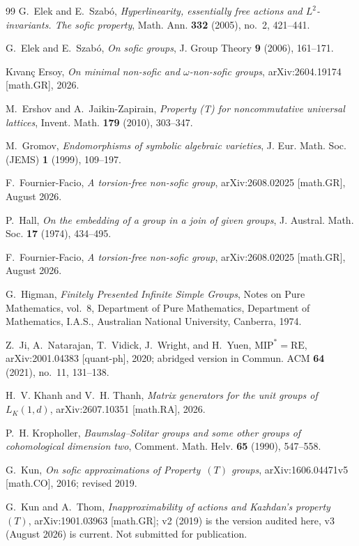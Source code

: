 \documentclass[11pt]{amsart}
\theoremstyle{definition}
\theoremstyle{plain}
\begin{document}
\begin{thebibliography}{99}
G.~Elek and E.~Szab\'o,
\emph{Hyperlinearity, essentially free actions and $L^2$-invariants.  The sofic property},
Math. Ann. \textbf{332} (2005), no.~2, 421--441.

G.~Elek and E.~Szab\'o,
\emph{On sofic groups},
J. Group Theory \textbf{9} (2006), 161--171.

K{\i}van\c{c} Ersoy,
\emph{On minimal non-sofic and $\omega$-non-sofic groups},
arXiv:2604.19174 [math.GR], 2026.

M.~Ershov and A.~Jaikin-Zapirain,
\emph{Property (T) for noncommutative universal lattices},
Invent. Math. \textbf{179} (2010), 303--347.

M.~Gromov,
\emph{Endomorphisms of symbolic algebraic varieties},
J. Eur. Math. Soc. (JEMS) \textbf{1} (1999), 109--197.

F.~Fournier-Facio,
\emph{A torsion-free non-sofic group},
arXiv:2608.02025 [math.GR], August 2026.

P.~Hall,
\emph{On the embedding of a group in a join of given groups},
J. Austral. Math. Soc. \textbf{17} (1974), 434--495.

F.~Fournier-Facio,
\emph{A torsion-free non-sofic group},
arXiv:2608.02025 [math.GR], August 2026.

G.~Higman,
\emph{Finitely Presented Infinite Simple Groups},
Notes on Pure Mathematics, vol.~8,
Department of Pure Mathematics, Department of Mathematics, I.A.S.,
Australian National University, Canberra, 1974.

Z.~Ji, A.~Natarajan, T.~Vidick, J.~Wright, and H.~Yuen,
\emph{$\mathrm{MIP}^*=\mathrm{RE}$},
arXiv:2001.04383 [quant-ph], 2020; abridged version in Commun. ACM \textbf{64} (2021), no.~11, 131--138.

H.~V. Khanh and V.~H. Thanh,
\emph{Matrix generators for the unit groups of $L_K(1,d)$},
arXiv:2607.10351 [math.RA], 2026.

P.~H. Kropholler,
\emph{Baumslag--Solitar groups and some other groups of cohomological dimension two},
Comment. Math. Helv. \textbf{65} (1990), 547--558.

G.~Kun,
\emph{On sofic approximations of Property~$(T)$ groups},
arXiv:1606.04471v5 [math.CO], 2016; revised 2019.

G.~Kun and A.~Thom,
\emph{Inapproximability of actions and Kazhdan's property~$(T)$},
arXiv:1901.03963 [math.GR]; v2 (2019) is the version audited here, v3 (August 2026) is current.  Not submitted for publication.


\end{thebibliography}
\end{document}
